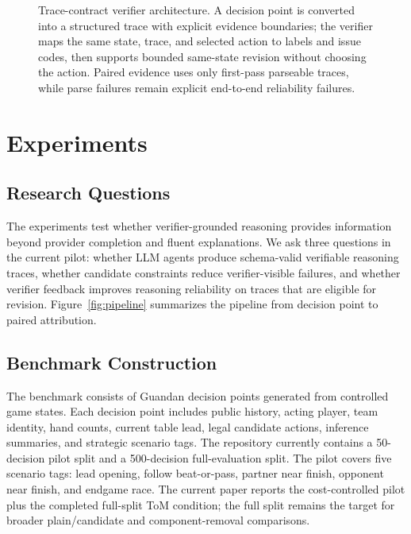 \documentclass[sigconf,anonymous,review]{acmart}
\begin{document}
\begin{figure}[t]
{
}
\vspace{-0.4em}
\caption{Trace-contract verifier architecture. A decision point is converted into a structured trace with explicit evidence boundaries; the verifier maps the same state, trace, and selected action to labels and issue codes, then supports bounded same-state revision without choosing the action. Paired evidence uses only first-pass parseable traces, while parse failures remain explicit end-to-end reliability failures.}
\vspace{-0.8em}
\label{fig:revision-architecture}
\end{figure}

\section{Experiments}

\subsection{Research Questions}

The experiments test whether verifier-grounded reasoning provides information beyond provider completion and fluent explanations. We ask three questions in the current pilot: whether LLM agents produce schema-valid verifiable reasoning traces, whether candidate constraints reduce verifier-visible failures, and whether verifier feedback improves reasoning reliability on traces that are eligible for revision. Figure~\ref{fig:pipeline} summarizes the pipeline from decision point to paired attribution.

\subsection{Benchmark Construction}

The benchmark consists of Guandan decision points generated from controlled game states. Each decision point includes public history, acting player, team identity, hand counts, current table lead, legal candidate actions, inference summaries, and strategic scenario tags. The repository currently contains a 50-decision pilot split and a 500-decision full-evaluation split. The pilot covers five scenario tags: lead opening, follow beat-or-pass, partner near finish, opponent near finish, and endgame race. The current paper reports the cost-controlled pilot plus the completed full-split ToM condition; the full split remains the target for broader plain/candidate and component-removal comparisons.
\end{document}
